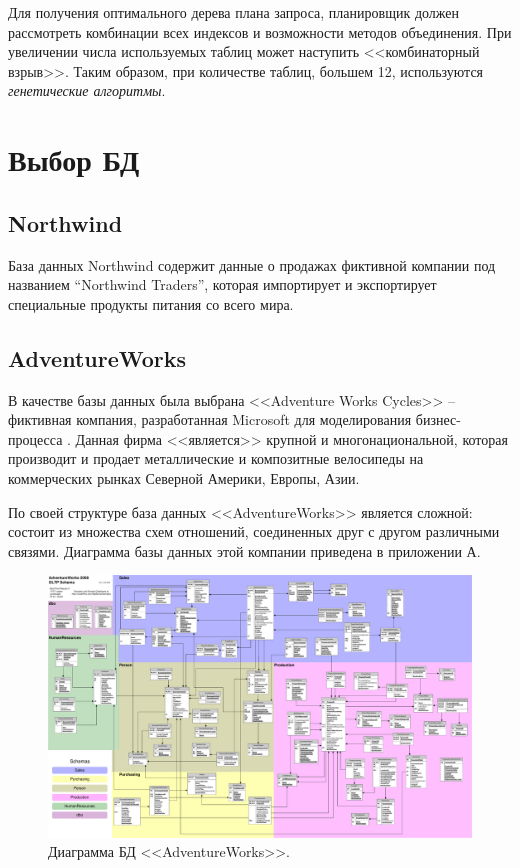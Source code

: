 Для получения оптимального дерева плана запроса, планировщик должен рассмотреть комбинации всех индексов и возможности методов объединения. При увеличении числа используемых таблиц может наступить <<комбинаторный взрыв>>. Таким образом, при количестве таблиц, большем 12, используются \textit{генетические алгоритмы}.

\section{Выбор БД}
\subsection{Northwind}
База данных Northwind содержит данные о продажах фиктивной компании под названием “Northwind Traders”, которая импортирует и экспортирует специальные продукты питания со всего мира.

\subsection{AdventureWorks}
В качестве базы данных была выбрана <<Adventure Works Cycles>> -- фиктивная компания, разработанная Microsoft для моделирования бизнес-процесса \cite{adventureworks}. Данная фирма <<является>> крупной и многонациональной, которая производит и продает металлические и композитные велосипеды на коммерческих рынках Северной Америки, Европы, Азии.

По своей структуре база данных <<AdventureWorks>> является сложной: состоит из множества схем отношений, соединенных друг с другом различными связями. Диаграмма базы данных этой компании приведена в приложении А.
\begin{figure}[H]
	\centering
	{
		\includegraphics[scale=0.27, angle=90]{./images/adventure_works_db_diagram.pdf}
		\caption{Диаграмма БД <<AdventureWorks>>.}
		\label{image:db_diagram_adventureworks}
	}
\end{figure}